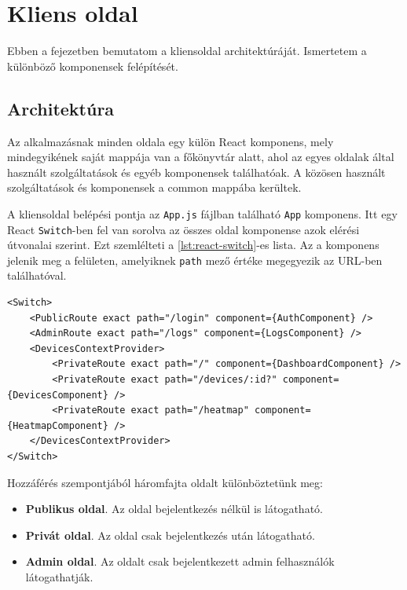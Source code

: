 \chapter{Kliens oldal}
\label{chapt:birdmap-frontend}
Ebben a fejezetben bemutatom a kliensoldal architektúráját. Ismertetem a különböző komponensek felépítését.

\section{Architektúra}
Az alkalmazásnak minden oldala egy külön React komponens, mely mindegyikének saját mappája van a főkönyvtár alatt, 
ahol az egyes oldalak által használt szolgáltatások és egyéb komponensek találhatóak.
A közösen használt szolgáltatások és komponensek a common mappába kerültek.

A kliensoldal belépési pontja az \verb+App.js+ fájlban található \verb+App+ komponens.
Itt egy React \verb+Switch+-ben fel van sorolva az összes oldal komponense azok elérési útvonalai szerint.
Ezt szemlélteti a \ref{lst:react-switch}-es lista.
Az a komponens jelenik meg a felületen, amelyiknek \verb+path+ mező értéke megegyezik az URL-ben találhatóval.

\begin{lstlisting}[style=jsx, caption=Az App.js Switch tartalma., label=lst:react-switch]
<Switch>
    <PublicRoute exact path="/login" component={AuthComponent} />
    <AdminRoute exact path="/logs" component={LogsComponent} />
    <DevicesContextProvider>
        <PrivateRoute exact path="/" component={DashboardComponent} />
        <PrivateRoute exact path="/devices/:id?" component={DevicesComponent} />
        <PrivateRoute exact path="/heatmap" component={HeatmapComponent} />
    </DevicesContextProvider>
</Switch>
\end{lstlisting}

Hozzáférés szempontjából háromfajta oldalt különböztetünk meg:
\begin{itemize}
    \item \textbf{Publikus oldal}. Az oldal bejelentkezés nélkül is látogatható.
    \item \textbf{Privát oldal}. Az oldal csak bejelentkezés után látogatható.
    \item \textbf{Admin oldal}. Az oldalt csak bejelentkezett admin felhasználók látogathatják.
\end{itemize}


